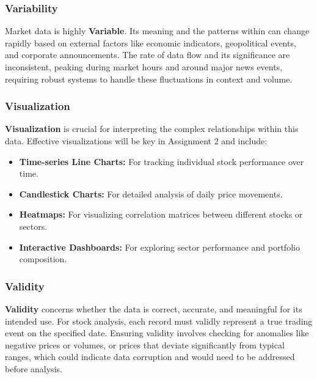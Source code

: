\documentclass[12pt,a4paper]{article}
\begin{document}
\subsubsection{Variability}
Market data is highly \textbf{Variable}. Its meaning and the patterns within can change rapidly based on external factors like economic indicators, geopolitical events, and corporate announcements. The rate of data flow and its significance are inconsistent, peaking during market hours and around major news events, requiring robust systems to handle these fluctuations in context and volume.

\subsubsection{Visualization}
\textbf{Visualization} is crucial for interpreting the complex relationships within this data. Effective visualizations will be key in Assignment 2 and include:
\begin{itemize}
    \item \textbf{Time-series Line Charts:} For tracking individual stock performance over time.
    \item \textbf{Candlestick Charts:} For detailed analysis of daily price movements.
    \item \textbf{Heatmaps:} For visualizing correlation matrices between different stocks or sectors.
    \item \textbf{Interactive Dashboards:} For exploring sector performance and portfolio composition.
\end{itemize}

\subsubsection{Validity}
\textbf{Validity} concerns whether the data is correct, accurate, and meaningful for its intended use. For stock analysis, each record must validly represent a true trading event on the specified date. Ensuring validity involves checking for anomalies like negative prices or volumes, or prices that deviate significantly from typical ranges, which could indicate data corruption and would need to be addressed before analysis.
\end{document}
